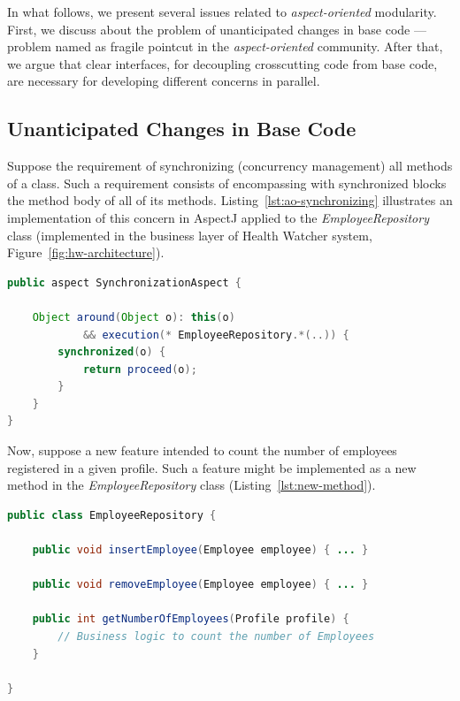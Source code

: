 In what follows, we present several issues related to \emph{aspect-oriented} 
modularity. First, we discuss about the problem of unanticipated changes 
in base code --- problem named as fragile pointcut in the \emph{aspect-oriented} community. After that, 
we argue that clear interfaces, for decoupling crosscutting code from base 
code, are necessary for developing different concerns in parallel.    

\subsection{Unanticipated Changes in Base Code}

Suppose the requirement of synchronizing (concurrency management) all methods of
a class. Such a requirement consists of encompassing with synchronized blocks the
method body of all of its methods. Listing~\ref{lst:ao-synchronizing} illustrates
an implementation of this concern in AspectJ applied to the
\emph{EmployeeRepository} class (implemented in the business layer of Health
Watcher system, Figure~\ref{fig:hw-architecture}).

\scriptsize
\begin{lstlisting}[frame=single, caption={Aspect responsible for implementing the concurrency concern.},label=lst:ao-synchronizing, language=Java]
public aspect SynchronizationAspect {

    Object around(Object o): this(o)
            && execution(* EmployeeRepository.*(..)) {
        synchronized(o) {
            return proceed(o);
        }
    }
}
\end{lstlisting}
\normalsize

Now, suppose a new feature intended to count the number of employees
registered in a given profile. Such a feature might be implemented as
a new method in the \emph{EmployeeRepository} class
(Listing~\ref{lst:new-method}).

\scriptsize
\begin{lstlisting}[frame=single, caption={A new method for counting the number of Employees.},label=lst:new-method, language=Java]
public class EmployeeRepository {

    public void insertEmployee(Employee employee) { ... }

    public void removeEmployee(Employee employee) { ... }

    public int getNumberOfEmployees(Profile profile) {
        // Business logic to count the number of Employees
    }

}
\end{lstlisting}
\normalsize

